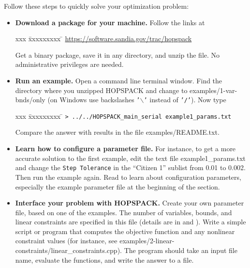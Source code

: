 \medskip
\noindent
Follow these steps to quickly solve your optimization problem:
\begin{itemize}
  \item  {\bf Download a package for your machine.}  Follow the links at
         \vspace{-11pt}
         \begin{tabbing}
         xxx \= xxxxxxxxx \= \kill
         \> \href{https://software.sandia.gov/trac/hopspack}
                 {https://software.sandia.gov/trac/hopspack}
         \end{tabbing}
         Get a binary package, save it in any directory, and unzip the file.
         No administrative privileges are needed.
  \item  {\bf Run an example.}  Open a command line terminal window.
         Find the directory where you unzipped HOPSPACK and change to
         {\sf examples/1-var-bnds/only}
         (on Windows use backslashes {\tt '$\backslash$'} instead of {\tt '/'}).
         Now type
         \vspace{-11pt}
         \begin{tabbing}
         xxx \= xxxxxxxxx \= \kill
         \> {\tt > ../../HOPSPACK\_main\_serial example1\_params.txt}
         \end{tabbing}
         Compare the answer with results in the file
         {\sf examples/README.txt}.
  \item  {\bf Learn how to configure a parameter file.}
         For instance, to get a more accurate solution to the first example,
         edit the text file {\sf example1\_params.txt} and change
         the {\tt Step Tolerance} in the ``Citizen 1'' sublist
         from 0.01 to 0.002.
         Then run the example again.
         Read  to learn about configuration parameters,
         especially the example parameter file at the beginning of the section.
  \item  {\bf Interface your problem with HOPSPACK.}
         Create your own parameter file, based on one of the examples.
         The number of variables, bounds, and linear constraints are specified
         in this file (details are in 
         and ).
         Write a simple script or program that computes the objective function
         and any nonlinear constraint values (for instance, see
         {\sf examples/2-linear-constraints/linear\_constraints.cpp}).
         The program should take an input file name, evaluate the functions,
         and write the answer to a file.

\end{itemize}
